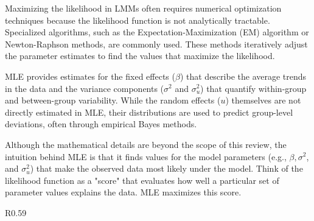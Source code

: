 Maximizing the likelihood in LMMs often requires numerical optimization techniques because the likelihood function is not analytically tractable. Specialized algorithms, such as the Expectation-Maximization (EM) algorithm or Newton-Raphson methods, are commonly used. These methods iteratively adjust the parameter estimates to find the values that maximize the likelihood.

MLE provides estimates for the fixed effects ($\beta$) that describe the average trends in the data and the variance components ($\sigma^2$ and $\sigma_u^2$) that quantify within-group and between-group variability. While the random effects ($u$) themselves are not directly estimated in MLE, their distributions are used to predict group-level deviations, often through empirical Bayes methods.

Although the mathematical details are beyond the scope of this review, the intuition behind MLE is that it finds values for the model parameters (e.g., $\beta, \sigma^2$, and $\sigma_u^2$) that make the observed data most likely under the model. Think of the likelihood function as a "score" that evaluates how well a particular set of parameter values explains the data. MLE maximizes this score.

\begin{wrapfigure}{R}{0.59\textwidth}
\begin{tcolorbox}[every float=\centering, drop shadow, title=One-parameter MLE ,colback=white,colframe=WMgreen,
  colbacktitle=WMgreen,]
  \label{fig:MLEplot}
 \end{tcolorbox}
 \end{wrapfigure}
 

